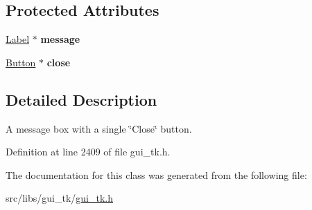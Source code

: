 \subsection*{Protected Attributes}
\begin{DoxyCompactItemize}
\item 
\hypertarget{classGUI_1_1MessageBox2_ad92a769376304d84d69e90614b2b64d8}{\hyperlink{classGUI_1_1Label}{Label} $\ast$ {\bfseries message}}\label{classGUI_1_1MessageBox2_ad92a769376304d84d69e90614b2b64d8}

\item 
\hypertarget{classGUI_1_1MessageBox2_ab17891fbe30f8b0f2f51038c9b1e2dbe}{\hyperlink{classGUI_1_1Button}{Button} $\ast$ {\bfseries close}}\label{classGUI_1_1MessageBox2_ab17891fbe30f8b0f2f51038c9b1e2dbe}

\end{DoxyCompactItemize}


\subsection{Detailed Description}
A message box with a single \char`\"{}\-Close\char`\"{} button. 

Definition at line 2409 of file gui\-\_\-tk.\-h.



The documentation for this class was generated from the following file\-:\begin{DoxyCompactItemize}
\item 
src/libs/gui\-\_\-tk/\hyperlink{gui__tk_8h}{gui\-\_\-tk.\-h}\end{DoxyCompactItemize}
